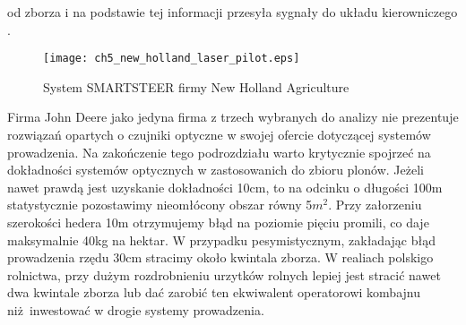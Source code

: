 od zborza i na podstawie tej informacji przesyła sygnały do układu kierowniczego \cite[][strona 18]{NEW_HOLLAND_PLM}.
\begin{figure}[H]
	\centering
	\texttt{[image: ch5\_new\_holland\_laser\_pilot.eps]}
	\caption{System SMARTSTEER firmy New Holland Agriculture}
	\label{new_holland_smartsteer}
\end{figure}
\indent Firma John Deere jako jedyna firma z trzech wybranych do analizy nie prezentuje rozwiązań opartych o czujniki optyczne w swojej ofercie dotyczącej 
systemów prowadzenia.
\indent Na zakończenie tego podrozdziału warto krytycznie spojrzeć na dokładności systemów optycznych w zastosowanich do zbioru plonów.
Jeżeli nawet prawdą jest uzyskanie dokładności 10cm, to na odcinku o długości 100m statystycznie pozostawimy nieomłócony obszar równy 5$m^2$.
Przy załorzeniu szerokości hedera 10m otrzymujemy błąd na poziomie pięciu promili, co daje maksymalnie 40kg na hektar. 
W przypadku pesymistycznym, zakładając błąd prowadzenia rzędu 30cm stracimy około kwintala zborza. 
W realiach polskigo rolnictwa, przy dużym rozdrobnieniu urzytków rolnych lepiej jest stracić nawet dwa kwintale zborza lub 
dać zarobić ten ekwiwalent operatorowi kombajnu niż inwestować w drogie systemy prowadzenia.
